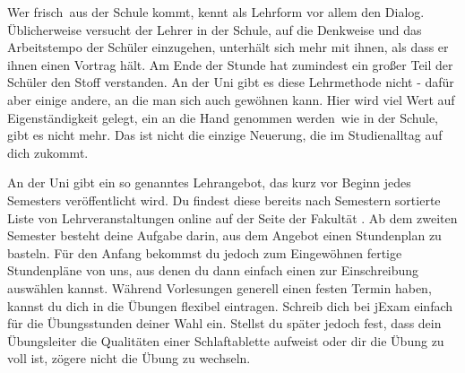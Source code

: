 

Wer \glqq frisch\grqq\ aus der Schule kommt, kennt als Lehrform vor allem den Dialog.
Üblicherweise versucht der Lehrer in der Schule, auf die Denkweise und das Arbeitstempo der Schüler einzugehen, unterhält sich mehr mit ihnen, als dass er ihnen einen Vortrag hält.
Am Ende der Stunde hat zumindest ein großer Teil der Schüler den Stoff verstanden.
An der Uni gibt es diese Lehrmethode nicht - dafür aber einige andere, an die man sich auch gewöhnen kann.
Hier wird viel Wert auf Eigenständigkeit gelegt, ein \glqq an die Hand genommen werden\grqq\ wie in der Schule, gibt es nicht mehr.
Das ist nicht die einzige Neuerung, die im Studienalltag auf dich zukommt.


An der Uni gibt ein so genanntes Lehrangebot, das kurz vor Beginn jedes Semesters veröffentlicht wird.
Du findest diese bereits nach Semestern sortierte Liste von Lehrveranstaltungen online auf der Seite der Fakultät .
Ab dem zweiten Semester besteht deine Aufgabe darin, aus dem Angebot einen Stundenplan zu basteln.
Für den Anfang bekommst du jedoch zum Eingewöhnen fertige Stundenpläne von uns, aus denen du dann einfach einen zur Einschreibung auswählen kannst.
Während Vorlesungen generell einen festen Termin haben, kannst du dich in die Übungen flexibel eintragen.
Schreib dich bei jExam  einfach für die Übungsstunden deiner Wahl ein.
Stellst du später jedoch fest, dass dein Übungsleiter die Qualitäten einer Schlaftablette aufweist oder dir die Übung zu voll ist, zögere nicht die Übung zu wechseln.



